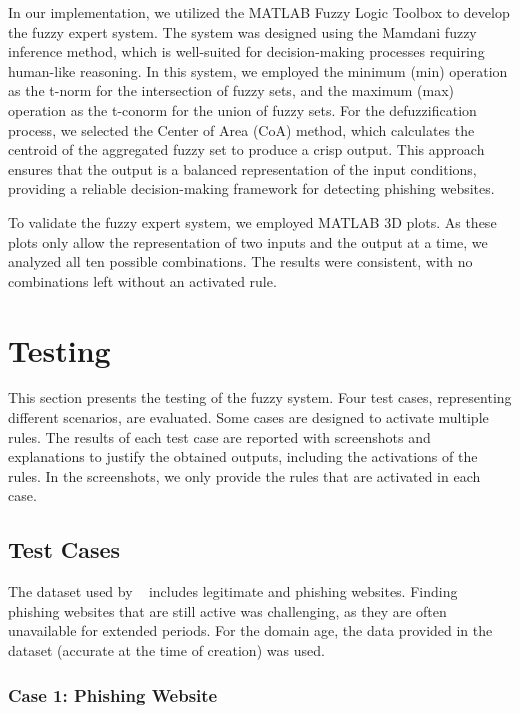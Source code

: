\documentclass[11pt]{article}
\begin{document}
In our implementation, we utilized the MATLAB Fuzzy Logic Toolbox to develop the fuzzy expert system. The system was designed using the Mamdani fuzzy inference method, which is well-suited for decision-making processes requiring human-like reasoning. In this system, we employed the minimum (min) operation as the t-norm for the intersection of fuzzy sets, and the maximum (max) operation as the t-conorm for the union of fuzzy sets. For the defuzzification process, we selected the Center of Area (CoA) method, which calculates the centroid of the aggregated fuzzy set to produce a crisp output. This approach ensures that the output is a balanced representation of the input conditions, providing a reliable decision-making framework for detecting phishing websites.

To validate the fuzzy expert system, we employed MATLAB 3D plots. As these plots only allow the representation of two inputs and the output at a time, we analyzed all ten possible combinations. The results were consistent, with no combinations left without an activated rule.


\section{Testing}

This section presents the testing of the fuzzy system. Four test cases, representing different scenarios, are evaluated. Some cases are designed to activate multiple rules. The results of each test case are reported with screenshots and explanations to justify the obtained outputs, including the activations of the rules. In the screenshots, we only provide the rules that are activated in each case.

\subsection{Test Cases}

The dataset used by ~\cite{mainpaper} includes legitimate and phishing websites. Finding phishing websites that are still active was challenging, as they are often unavailable for extended periods. For the domain age, the data provided in the dataset (accurate at the time of creation) was used.

\subsubsection{Case 1: Phishing Website}
\end{document}
